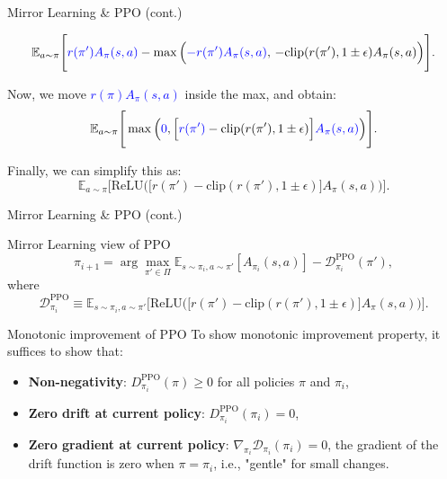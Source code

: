 \documentclass[9pt]{beamer}
\begin{document}
\begin{frame}{Mirror Learning \& PPO (cont.)}

\[
    \mathbb{E}_{a \sim \pi} \Bigg[ \textcolor{blue}{r(\pi')A_\pi(s,a)} - \max \Big(\textcolor{blue}{-r(\pi') A_{\pi}(s, a)}, \,-\text{clip}(r(\pi'), 1 \pm \epsilon) A_{\pi}(s, a) \Big) \Bigg].
  \]

\pause
  Now, we move \textcolor{blue}{\( r(\pi) A_{\pi}(s, a) \)} inside the max, and obtain:
\[
    \mathbb{E}_{a \sim \pi} \Bigg[ \max \Big( \textcolor{blue}{0}, \Big[\textcolor{blue}{r(\pi')}-\text{clip}(r(\pi'), 1 \pm \epsilon) \Big]\textcolor{blue}{A_{\pi}(s, a)} \Big) \Bigg].
  \]
\pause

  Finally, we can simplify this as:
\[
    \mathbb{E}_{a \sim \pi} \Bigg[ \text{ReLU} \Big(\Big[r(\pi')-\text{clip}(r(\pi'), 1 \pm \epsilon) \Big]A_{\pi}(s, a) \Big) \Bigg].
  \]

\end{frame}


\begin{frame}{Mirror Learning \& PPO (cont.)}

  \begin{block}{Mirror Learning view of PPO}
    \vspace{1em}  %
    \[
    \pi_{i+1} = \arg \max_{\pi' \in \Pi} \mathbb{E}_{s \sim \pi_i, a \sim \pi'} \left[ A_{\pi_i}(s, a) \right] - \mathcal{D}^{\text{PPO}}_{\pi_i}(\pi'),
  \]
  where
\[
    \mathcal{D}^{\text{PPO}}_{\pi_i} \equiv \mathbb{E}_{s \sim \pi_i, a \sim \pi'} \Bigg[ \text{ReLU} \Big(\Big[r(\pi')-\text{clip}(r(\pi'), 1 \pm \epsilon) \Big]A_{\pi}(s, a) \Big) \Bigg].
  \]
    \vspace{1em}  %
  \end{block}

    \pause
  \begin{block}{Monotonic improvement of PPO}
    To show monotonic improvement property, it suffices to show that:
    \begin{itemize}
      \item \textbf{Non-negativity}: \( D^{\text{PPO}}_{\pi_i}(\pi) \geq 0 \) for all policies \( \pi \) and \( \pi_i \),
      \item \textbf{Zero drift at current policy}: \( D^{\text{PPO}}_{\pi_i}(\pi_i) = 0 \),
      \item \textbf{Zero gradient at current policy}: \( \nabla_{\pi_i} \mathcal{D}_{\pi_i}(\pi_i) = 0 \), the gradient of the drift function is zero when \( \pi = \pi_i \), i.e., "gentle" for small changes.
    \end{itemize}
  \end{block}
\end{frame}
\end{document}
